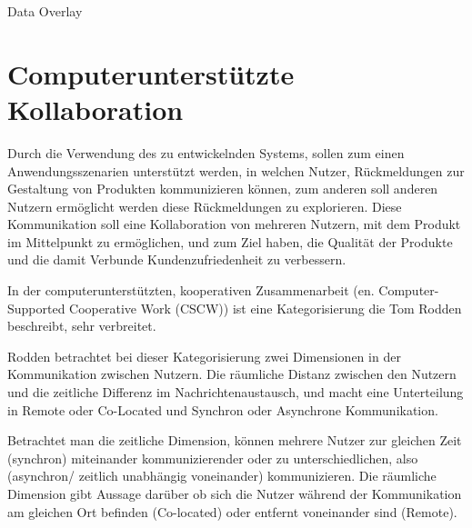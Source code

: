 


Data Overlay 




\section{Computerunterstützte Kollaboration}

Durch die Verwendung des zu entwickelnden Systems, sollen zum einen Anwendungsszenarien unterstützt werden, in welchen Nutzer, 
Rückmeldungen zur Gestaltung von Produkten kommunizieren können, zum anderen soll anderen Nutzern 
ermöglicht werden diese Rückmeldungen zu explorieren. Diese Kommunikation soll eine Kollaboration von 
mehreren Nutzern, mit dem Produkt im Mittelpunkt zu ermöglichen, 
und zum Ziel haben, die Qualität der Produkte und die damit Verbunde Kundenzufriedenheit zu verbessern.     

In der computerunterstützten, kooperativen Zusammenarbeit (en. Computer-Supported Cooperative Work (CSCW)) 
ist eine Kategorisierung die Tom Rodden \cite[S.~2]{Rodden1992} beschreibt, sehr verbreitet.  

Rodden betrachtet bei dieser Kategorisierung zwei Dimensionen in der Kommunikation zwischen Nutzern. 
Die räumliche Distanz zwischen den Nutzern und die zeitliche Differenz im Nachrichtenaustausch, und macht eine 
Unterteilung in Remote oder Co-Located und Synchron oder Asynchrone Kommunikation.

Betrachtet man die zeitliche Dimension, können mehrere Nutzer zur gleichen Zeit (synchron) miteinander kommunizierender 
oder zu unterschiedlichen, also (asynchron/ zeitlich unabhängig voneinander) kommunizieren. Die räumliche Dimension 
gibt Aussage darüber ob sich die Nutzer während der Kommunikation am gleichen Ort befinden (Co-located) oder entfernt voneinander sind (Remote). 

